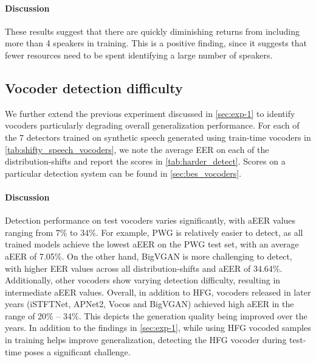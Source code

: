 \paragraph{Discussion} These results suggest that there are quickly diminishing returns from including more than 4 speakers in training. This is a positive finding, since it suggests that fewer resources need to be spent identifying a large number of speakers. 

\subsection{Vocoder detection difficulty}\label{sec:exp-2} We further extend the previous experiment discussed in \autoref{sec:exp-1} to identify vocoders particularly degrading overall generalization performance.
For each of the 7 detectors trained on synthetic speech generated using train-time vocoders in \autoref{tab:shifty_speech_vocoders}, we note the average EER on each of the distribution-shifts and report the scores in \autoref{tab:harder_detect}. Scores on a particular detection system can be found in \autoref{sec:bes_vocoders}.

\paragraph{Discussion} Detection performance on test vocoders varies significantly, with aEER values ranging from 7\% to 34\%. For example, PWG is relatively easier to detect, as all trained models achieve the lowest aEER on the PWG test set, with an average aEER of 7.05\%. On the other hand, BigVGAN is more challenging to detect, with higher EER values across all distribution-shifts and aEER of 34.64\%. Additionally, other vocoders show varying detection difficulty, resulting in intermediate aEER values. Overall, in addition to HFG, vocoders released in later years (iSTFTNet, APNet2, Vocos and BigVGAN) achieved high aEER in the range of 20\% -- 34\%. This depicts the generation quality being improved over the years. In addition to the findings in \autoref{sec:exp-1}, while using HFG vocoded samples in training helps improve generalization, detecting the HFG vocoder during test-time poses a significant challenge. 

